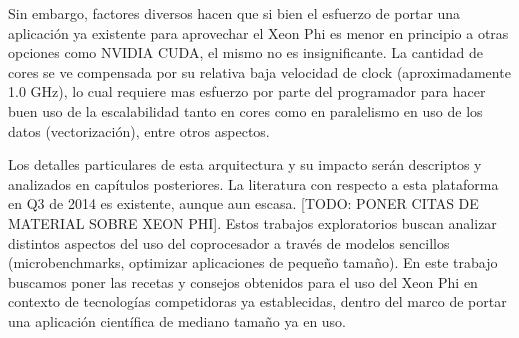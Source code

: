 Sin embargo, factores diversos hacen que si bien el esfuerzo de portar una aplicación ya existente para aprovechar el Xeon Phi es menor en principio
a otras opciones como NVIDIA CUDA, el mismo no es insignificante. La cantidad de cores se ve compensada por su relativa baja velocidad de clock
(aproximadamente 1.0 GHz), lo cual requiere mas esfuerzo por parte del programador para hacer buen uso de la escalabilidad tanto en cores como en
paralelismo en uso de los datos (vectorización), entre otros aspectos.

Los detalles particulares de esta arquitectura y su impacto serán descriptos y analizados en capítulos posteriores.
La literatura con respecto a esta plataforma en Q3 de 2014 es existente, aunque aun escasa. [TODO: PONER CITAS DE MATERIAL SOBRE XEON PHI]. Estos trabajos
exploratorios buscan analizar distintos aspectos del uso del coprocesador a trav\'es de  modelos sencillos (microbenchmarks, optimizar aplicaciones de peque\~no tama\~no). En este trabajo buscamos
poner las recetas y consejos obtenidos para el uso del Xeon Phi en contexto de tecnolog\'ias competidoras ya establecidas, dentro del marco de portar una aplicaci\'on cient\'ifica de mediano tama\~no ya en uso.
